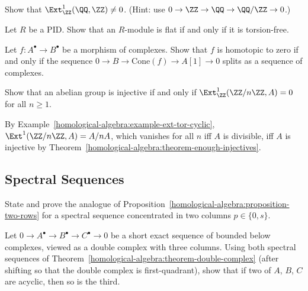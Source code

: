 \begin{exercise}\label{homological-algebra:exercise-ext-divisible}
Show that $\Ext^1_\ZZ(\QQ, \ZZ) \neq 0$. (Hint: use $0 \to \ZZ \to \QQ \to \QQ/\ZZ \to 0$.)
\end{exercise}

\begin{exercise}\label{homological-algebra:exercise-tor-torsion-free}
Let $R$ be a PID. Show that an $R$-module is flat if and only if it is torsion-free.
\end{exercise}

\begin{exercise}\label{homological-algebra:exercise-derived-cone}
Let $f \colon A^\bullet \to B^\bullet$ be a morphism of complexes. Show that $f$ is homotopic to zero if and only if the sequence
$0 \to B \to \mathrm{Cone}(f) \to A[1] \to 0$ splits as a sequence of complexes.
\end{exercise}

\begin{exercise}\label{homological-algebra:exercise-injective-dimension}
Show that an abelian group is injective if and only if $\Ext^1_\ZZ(\ZZ/n\ZZ, A) = 0$ for all $n \geq 1$.
\end{exercise}

\begin{solution}
By Example~\ref{homological-algebra:example-ext-tor-cyclic}, $\Ext^1(\ZZ/n\ZZ, A) = A/nA$, which vanishes for all $n$ iff $A$ is
divisible, iff $A$ is injective by Theorem~\ref{homological-algebra:theorem-enough-injectives}.
\end{solution}

\subsection{Spectral Sequences}\label{homological-algebra:subsection-exercises-spectral-sequences}

\begin{exercise}\label{homological-algebra:exercise-two-columns}
State and prove the analogue of Proposition~\ref{homological-algebra:proposition-two-rows} for a spectral sequence concentrated in two
columns $p \in \{0, s\}$.
\end{exercise}

\begin{exercise}\label{homological-algebra:exercise-two-out-of-three}
Let $0 \to A^\bullet \to B^\bullet \to C^\bullet \to 0$ be a short exact sequence of bounded below complexes, viewed as a double complex with three
columns. Using both spectral sequences of Theorem~\ref{homological-algebra:theorem-double-complex} (after shifting so that the double complex is
first-quadrant), show that if two of $A$, $B$, $C$ are acyclic, then so is the third.
\end{exercise}

